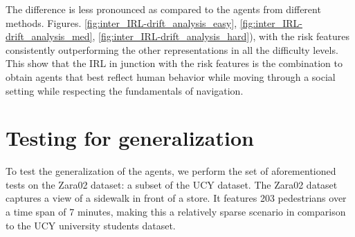 The difference is less pronounced as compared to the agents from different methods. Figures. \ref{fig:inter_IRL-drift_analysis_easy}, \ref{fig:inter_IRL-drift_analysis_med}, \ref{fig:inter_IRL-drift_analysis_hard}), with the risk features consistently outperforming the other representations in all the difficulty levels. This show that the IRL in junction with the risk features is the combination to obtain agents that best reflect human behavior while moving through a social setting while respecting the fundamentals of navigation.

\vspace{4cm}
\section{Testing for generalization}
\label{sec:generalization}
To test the generalization of the agents, we perform the set of aforementioned tests on the Zara02 dataset: a subset of the UCY dataset. The Zara02 dataset captures a view of a sidewalk in front of a store. It features 203 pedestrians over a time span of 7 minutes, making this a relatively sparse scenario in comparison to the UCY university students dataset.

